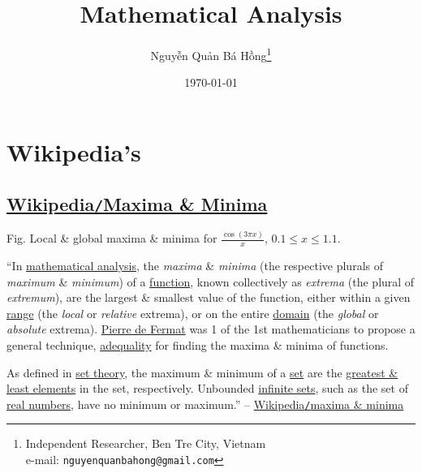 \documentclass[oneside]{book}
\title{Mathematical Analysis}
\author{\selectlanguage{vietnamese} Nguyễn Quản Bá Hồng\footnote{Independent Researcher, Ben Tre City, Vietnam\\e-mail: \texttt{nguyenquanbahong@gmail.com}}}
\date{\today}
\numberwithin{equation}{section}
\begin{document}
\maketitle
\setcounter{secnumdepth}{4}
\setcounter{tocdepth}{4}
\tableofcontents



\chapter{Wikipedia's}

\section{\href{https://en.wikipedia.org/wiki/Maxima_and_minima}{Wikipedia\texttt{/}Maxima \& Minima}}
\textsf{Fig. Local \& global maxima \& minima for $\frac{\cos(3\pi x)}{x}$, $0.1\le x\le 1.1$.}

``In \href{https://en.wikipedia.org/wiki/Mathematical_analysis}{mathematical analysis}, the \textit{maxima} \& \textit{minima} (the respective plurals of \textit{maximum} \& \textit{minimum}) of a \href{https://en.wikipedia.org/wiki/Function_(mathematics)}{function}, known collectively as \textit{extrema} (the plural of \textit{extremum}), are the largest \& smallest value of the function, either within a given \href{https://en.wikipedia.org/wiki/Interval_(mathematics)}{range} (the \textit{local} or \textit{relative} extrema), or on the entire \href{https://en.wikipedia.org/wiki/Domain_of_a_function}{domain} (the \textit{global} or \textit{absolute} extrema). \href{https://en.wikipedia.org/wiki/Pierre_de_Fermat}{Pierre de Fermat} was 1 of the 1st mathematicians to propose a general technique, \href{https://en.wikipedia.org/wiki/Adequality}{adequality} for finding the maxima \& minima of functions.

As defined in \href{https://en.wikipedia.org/wiki/Set_theory}{set theory}, the maximum \& minimum of a \href{https://en.wikipedia.org/wiki/Set_(mathematics)}{set} are the \href{https://en.wikipedia.org/wiki/Greatest_and_least_elements}{greatest \& least elements} in the set, respectively. Unbounded \href{https://en.wikipedia.org/wiki/Infinite_set}{infinite sets}, such as the set of \href{https://en.wikipedia.org/wiki/Real_number}{real numbers}, have no minimum or maximum.'' -- \href{https://en.wikipedia.org/wiki/Maxima_and_minima}{Wikipedia\texttt{/}maxima \& minima}
\end{document}
